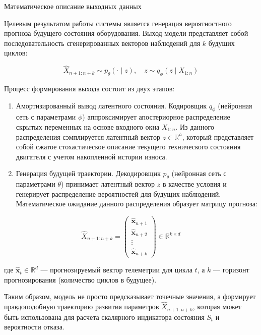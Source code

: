\documentclass[14pt, a4paper, oneside]{extreport}
\begin{document}
Математическое описание выходных данных

Целевым результатом работы системы является генерация вероятностного прогноза будущего состояния оборудования. Выход модели представляет собой последовательность сгенерированных векторов наблюдений для $k$ будущих циклов:

\begin{equation}
\hat{X}_{n+1:n+k} \sim p_\theta(\cdot \mid z), \quad z \sim q_\phi(z \mid X_{1:n})
\end{equation}

Процесс формирования выхода состоит из двух этапов:

\begin{enumerate}
\item Амортизированный вывод латентного состояния. Кодировщик $q_\phi$ (нейронная сеть с параметрами $\phi$) аппроксимирует апостериорное распределение скрытых переменных на основе входного окна $X_{1:n}$. Из данного распределения сэмплируется латентный вектор $z \in \mathbb{R}^h$, который представляет собой сжатое стохастическое описание текущего технического состояния двигателя с учетом накопленной истории износа.

\item Генерация будущей траектории. Декодировщик $p_\theta$ (нейронная сеть с параметрами $\theta$) принимает латентный вектор $z$ в качестве условия и генерирует распределение вероятностей для будущих наблюдений. Математическое ожидание данного распределения образует матрицу прогноза:
\end{enumerate}

\begin{equation}
\hat{X}_{n+1:n+k} = 
\begin{pmatrix}
\hat{\mathbf{x}}_{n+1} \\
\hat{\mathbf{x}}_{n+2} \\
\vdots \\
\hat{\mathbf{x}}_{n+k}
\end{pmatrix} \in \mathbb{R}^{k \times d}
\end{equation}

где $\hat{\mathbf{x}}_{t} \in \mathbb{R}^d$ — прогнозируемый вектор телеметрии для цикла $t$, а $k$ — горизонт прогнозирования (количество циклов в будущее).

Таким образом, модель не просто предсказывает точечные значения, а формирует правдоподобную траекторию развития параметров $\hat{X}_{n+1:n+k}$, которая может быть использована для расчета скалярного индикатора состояния $S_t$ и вероятности отказа.
\end{document}
